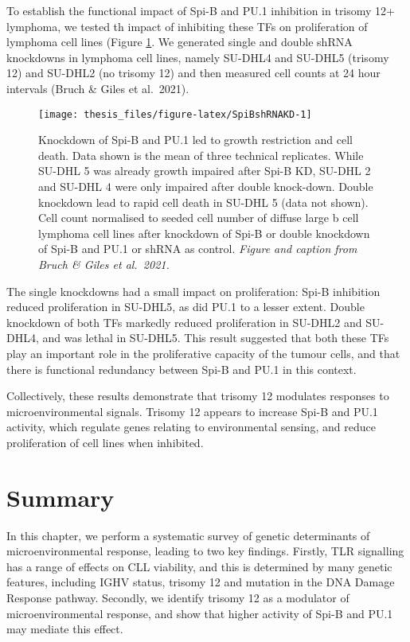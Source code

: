 \documentclass[11pt, a4paper, twosided]{book}
\begin{document}
To establish the functional impact of Spi-B and PU.1 inhibition in trisomy 12+ lymphoma, we tested th impact of inhibiting these TFs on proliferation of lymphoma cell lines (Figure \ref{fig:SpiBshRNAKD}. We generated single and double shRNA knockdowns in lymphoma cell lines, namely SU-DHL4 and SU-DHL5 (trisomy 12) and SU-DHL2 (no trisomy 12) and then measured cell counts at 24 hour intervals (Bruch \& Giles et al.~2021).


\begin{figure}

{\centering \texttt{[image: thesis\_files/figure-latex/SpiBshRNAKD-1]} 

}

\caption{Knockdown of Spi-B and PU.1 led to growth restriction and cell death. Data shown is the mean of three technical replicates. While SU-DHL 5 was already growth impaired after Spi-B KD, SU-DHL 2 and SU-DHL 4 were only impaired after double knock-down. Double knockdown lead to rapid cell death in SU-DHL 5 (data not shown). Cell count normalised to seeded cell number of diffuse large b cell lymphoma cell lines after knockdown of Spi-B or double knockdown of Spi-B and PU.1 or shRNA as control. \emph{Figure and caption from Bruch \& Giles et al.~2021.}}\label{fig:SpiBshRNAKD}
\end{figure}
The single knockdowns had a small impact on proliferation: Spi-B inhibition reduced proliferation in SU-DHL5, as did PU.1 to a lesser extent. Double knockdown of both TFs markedly reduced proliferation in SU-DHL2 and SU-DHL4, and was lethal in SU-DHL5. This result suggested that both these TFs play an important role in the proliferative capacity of the tumour cells, and that there is functional redundancy between Spi-B and PU.1 in this context.

Collectively, these results demonstrate that trisomy 12 modulates responses to microenvironmental signals. Trisomy 12 appears to increase Spi-B and PU.1 activity, which regulate genes relating to environmental sensing, and reduce proliferation of cell lines when inhibited.

\hypertarget{summary-1}{%
\section{Summary}\label{summary-1}}

In this chapter, we perform a systematic survey of genetic determinants of microenvironmental response, leading to two key findings. Firstly, TLR signalling has a range of effects on CLL viability, and this is determined by many genetic features, including IGHV status, trisomy 12 and mutation in the DNA Damage Response pathway. Secondly, we identify trisomy 12 as a modulator of microenvironmental response, and show that higher activity of Spi-B and PU.1 may mediate this effect.
\end{document}
